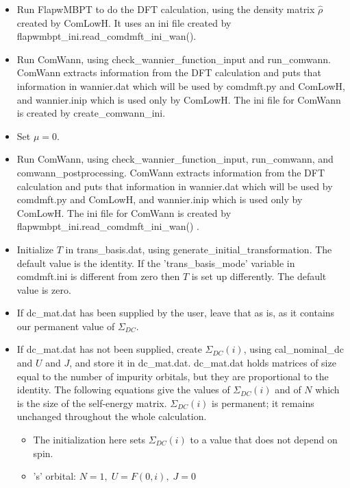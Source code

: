 \documentclass[aps,prb,singlecolumn,preprintnumbers,amsmath,amssymb]{revtex4}
\begin{document}
\begin{itemize}
\item Run FlapwMBPT to do the DFT calculation, using the density matrix $\hat{\rho}$ created by ComLowH.  It uses an ini file created by flapwmbpt\_ini.read\_comdmft\_ini\_wan().   
\item Run ComWann, using check\_wannier\_function\_input and run\_comwann.  ComWann extracts information from the DFT calculation and puts that information in wannier.dat which will be used by comdmft.py and ComLowH, and wannier.inip which is used only by ComLowH.  The ini file for ComWann is created by  create\_comwann\_ini.
\item Set $\mu = 0$.
\item Run ComWann, using check\_wannier\_function\_input, run\_comwann, and comwann\_postprocessing.  ComWann extracts information from the DFT calculation and puts that information in wannier.dat which will be used by comdmft.py and ComLowH, and wannier.inip which is used only by ComLowH.  The ini file for ComWann is created by flapwmbpt\_ini.read\_comdmft\_ini\_wan() .
\item Initialize $T$ in trans\_basis.dat, using generate\_initial\_transformation. The default value is the identity. If the 'trans\_basis\_mode' variable in comdmft.ini is different from zero then $T$ is set up differently. The default value is zero.
\item If dc\_mat.dat has been supplied by the user, leave that as is, as it contains our permanent value of $\Sigma_{DC}$.
\item If dc\_mat.dat has not been supplied, create $\Sigma_{DC}(i)$, using cal\_nominal\_dc and $U$ and $J$, and store it in dc\_mat.dat. dc\_mat.dat holds matrices of size equal to the number of impurity orbitals, but they are proportional to the identity.  The following equations give the values of  $\Sigma_{DC}(i)$ and of $N$ which is the size of the self-energy matrix.  $\Sigma_{DC}(i)$ is permanent; it remains unchanged throughout the whole calculation. %
\begin{itemize}
\item The initialization here sets $\Sigma_{DC}(i)$ to a value that does not depend on spin.
\item 's' orbital: $N=1, \; U=F(0,i), \; J=0$

\end{itemize}
\end{itemize}
\end{document}
